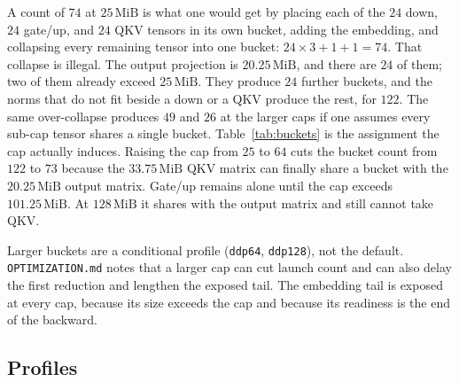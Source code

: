 \documentclass[11pt]{article}
\DeclareRobustCommand{\code}[1]{\texttt{#1}}
\newcommand{\MiB}{\,\mathrm{MiB}}
\begin{document}
A count of \(74\) at \(25\MiB\) is what one would get by placing each of the
\(24\) down, \(24\) gate/up, and \(24\) QKV tensors in its own bucket, adding
the embedding, and collapsing every remaining tensor into one bucket:
\(24\times 3+1+1=74\). That collapse is illegal. The output projection is
\(20.25\MiB\), and there are \(24\) of them; two of them already exceed
\(25\MiB\). They produce \(24\) further buckets, and the norms that do not
fit beside a down or a QKV produce the rest, for \(122\). The same
over-collapse produces \(49\) and \(26\) at the larger caps if one assumes
every sub-cap tensor shares a single bucket. Table~\ref{tab:buckets} is the
assignment the cap actually induces. Raising the cap from \(25\) to \(64\)
cuts the bucket count from \(122\) to \(73\) because the \(33.75\MiB\) QKV
matrix can finally share a bucket with the \(20.25\MiB\) output matrix.
Gate/up remains alone until the cap exceeds \(101.25\MiB\). At \(128\MiB\) it
shares with the output matrix and still cannot take QKV.

Larger buckets are a conditional profile (\code{ddp64}, \code{ddp128}), not
the default. \code{OPTIMIZATION.md} notes that a larger cap can cut launch
count and can also delay the first reduction and lengthen the exposed tail.
The embedding tail is exposed at every cap, because its size exceeds the cap
and because its readiness is the end of the backward.

\subsection{Profiles}
\end{document}

